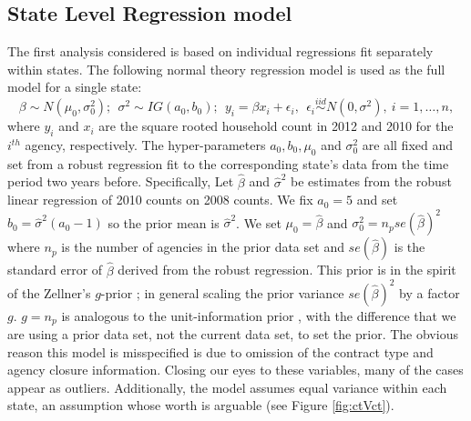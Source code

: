 \documentclass[ba]{imsart}
\def\bbeta{\mbox{\boldmath $\beta$}}
\def\bmu{\mbox{\boldmath $\mu$}}
\newcommand{\bx}{\mbox{\boldmath $x$}}
\newcommand{\iid}{\stackrel{iid}{\sim}}
\begin{document}
\subsection{State Level Regression model}
\label{regModelNW}
The first analysis considered is based on individual regressions fit separately within states.  The following normal theory regression model is used as the full model for a single state:
\begin{equation}
\label{eq:regModel}
\beta\sim N(\mu_0, \sigma^{2}_0);\ \ \sigma^2\sim IG(a_0,b_0);\ \  
y_{i}=\beta x_{i} +\epsilon_{i},\ \ \epsilon_{i}\iid N(0, \sigma^2),\ i=1,\dots, n, 
\end{equation}
where $y_{i}$ and $x_{i}$ are the square rooted household count in 2012 and 2010 for the $i^{th}$ agency, respectively. 
The hyper-parameters $a_0, b_0, \mu_0$ and $\sigma^{2}_0$ are all fixed and set from a 
robust regression fit to the corresponding state's data from the time period two years
before. Specifically, Let $\hat\beta$ and $\hat\sigma^{2}$ be estimates from the robust linear regression of 2010 counts on 2008 counts.  We fix $a_0 = 5$ and set $b_0 = \hat\sigma^{2}(a_0 - 1)$ so the prior mean is $\hat\sigma^{2}$. We set $\mu_0 = \hat\beta$ and $\sigma^{2}_0 =  n_{p}se(\hat\beta)^{2}$ where $n_{p}$ is the number of agencies in the prior data set and $se(\hat\beta)$ is the standard error of $\hat\beta$ derived from the robust regression. %
This prior is in the spirit of the Zellner's $g$-prior \citep{zellner1986, liang2008}; in general scaling the prior variance $se(\hat\beta)^{2}$ by a factor $g$. $g = n_{p}$ is analogous to the unit-information prior \citep{kass1995reference}, with the difference that we are using a prior data set, not the current data set, to set the prior. The obvious reason this model is misspecified is due to omission of the contract type and agency closure information.  Closing our eyes to these variables, many of the cases appear as outliers. Additionally, the model assumes equal variance within each state, an assumption whose worth is arguable (see Figure \ref{fig:ctVct}). %
\end{document}
